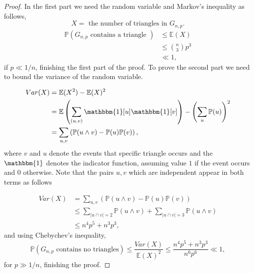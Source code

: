 \documentclass[12pt,twoside,a4paper]{book}
\numberwithin{equation}{section}
\theoremstyle{remark}
\begin{document}
\begin{proof}
In the first part we need the random variable and  Markov's inequality as follows,
$$ X = \text{ the number of triangles in } G_{n,p}.$$
\begin{align*}
\mathbb{P}(G_{n,p}\text{ contains a triangle }) &\leq \mathbb{E}(X)\\
& \leq \binom{n}{3}p^3 \\
& \ll 1,
\end{align*}
if $ p \ll 1/n$, finishing the first part of the proof. To prove the second part we need to bound the variance of the random variable.

\begin{align*}
Var(X) &= \mathbb{E}(X^2) - \mathbb{E}(X)^2\\
& = \mathbb{E} \left( \sum_{(u, v)} \mathbbm{1}[u]\mathbbm{1}[v] \right) - \left( \sum_u \mathbb{P}(u) \right) ^2\\
& = \sum_{u,v} \left(\mathbb{P}(u \wedge v) - \mathbb{P}(u)\mathbb{P}(v)\right),
\end{align*}
where $v$ and $u$ denote the events that specific triangle occurs and the $\mathbbm{1}$ denotes the indicator function, assuming value $1$ if the event occurs and $0$ otherwise. Note that the pairs $u,v$ which are independent appear in both terms as follows

\begin{align*}
Var(X) &= \sum_{u,v} \left(\mathbb{P}(u \wedge v) - \mathbb{P}(u)\mathbb{P}(v)\right)\\
& \leq \sum_{|u \cap v| = 2}\mathbb{P}(u \wedge v) + \sum_{|u \cap v| = 3}\mathbb{P}(u \wedge v)\\
&\leq n^4 p^5 + n^3 p^3,
\end{align*}
and using Chebychev's inequality,
$$\mathbb{P}(G_{n,p} \text{ contains no triangles}) \leq \frac{Var(X)}{\mathbb{E}(X)^2} \leq \frac{n^4p^5 + n^3p^3 }{n^6p^6} \ll 1,$$
for $p \gg 1/n$, finishing the proof.
 \end{proof}
\end{document}
